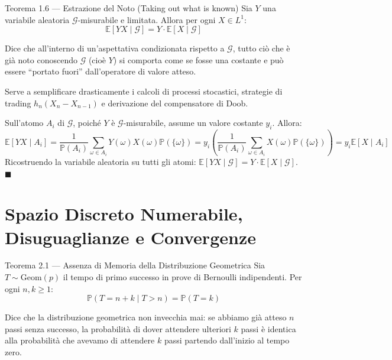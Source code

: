 \documentclass[11pt,a4paper]{report}
\newcommand{\PP}{\mathbb{P}}
\newcommand{\E}{\mathbb{E}}
\newcommand{\G}{\mathcal{G}}
\newcommand{\1}{\mathbf{1}}
\begin{document}
\vspace{0.4cm}

\begin{teoremabox}{Teorema 1.6 --- Estrazione del Noto (Taking out what is known)}
Sia $Y$ una variabile aleatoria $\G$-misurabile e limitata. Allora per ogni $X \in L^1$:
\[ \E[Y X \mid \G] = Y \cdot \E[X \mid \G] \]
\end{teoremabox}

\begin{cosafa}
Dice che all'interno di un'aspettativa condizionata rispetto a $\G$, tutto ciò che è già noto conoscendo $\G$ (cioè $Y$) si comporta come se fosse una costante e può essere ``portato fuori'' dall'operatore di valore atteso.
\end{cosafa}

\begin{acosaserve}
Serve a semplificare drasticamente i calcoli di processi stocastici, strategie di trading $h_n (X_n - X_{n-1})$ e derivazione del compensatore di Doob.
\end{acosaserve}

\begin{dimostrazione}
Sull'atomo $A_i$ di $\G$, poiché $Y$ è $\G$-misurabile, assume un valore costante $y_i$. Allora:
\[ \E[Y X \mid A_i] = \frac{1}{\PP(A_i)} \sum_{\omega \in A_i} Y(\omega)X(\omega)\PP(\{\omega\}) = y_i \left( \frac{1}{\PP(A_i)} \sum_{\omega \in A_i} X(\omega)\PP(\{\omega\}) \right) = y_i \E[X \mid A_i] \]
Ricostruendo la variabile aleatoria su tutti gli atomi: $\E[YX \mid \G] = Y \cdot \E[X \mid \G]$. $\blacksquare$
\end{dimostrazione}

\newpage

\chapter{Spazio Discreto Numerabile, Disuguaglianze e Convergenze}

\begin{teoremabox}{Teorema 2.1 --- Assenza di Memoria della Distribuzione Geometrica}
Sia $T \sim \text{Geom}(p)$ il tempo di primo successo in prove di Bernoulli indipendenti. Per ogni $n, k \ge 1$:
\[ \PP(T = n + k \mid T > n) = \PP(T = k) \]
\end{teoremabox}

\begin{cosafa}
Dice che la distribuzione geometrica non invecchia mai: se abbiamo già atteso $n$ passi senza successo, la probabilità di dover attendere ulteriori $k$ passi è identica alla probabilità che avevamo di attendere $k$ passi partendo dall'inizio al tempo zero.
\end{cosafa}
\end{document}
